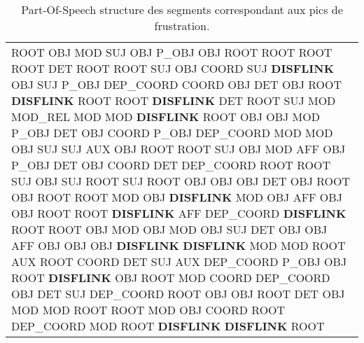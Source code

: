 \begin{table}[h]
    \centering
    \begin{tabular}{|l|}
         \hline
          ROOT OBJ MOD SUJ OBJ P_OBJ OBJ ROOT ROOT ROOT
          ROOT DET ROOT ROOT SUJ OBJ COORD SUJ \textbf{DISFLINK} OBJ SUJ P_OBJ DEP_COORD COORD OBJ DET OBJ
          ROOT \textbf{DISFLINK}
          ROOT ROOT \textbf{DISFLINK} DET ROOT SUJ MOD MOD_REL MOD MOD
          \textbf{DISFLINK}
          ROOT OBJ OBJ MOD P_OBJ DET OBJ COORD P_OBJ DEP_COORD MOD MOD OBJ SUJ SUJ AUX OBJ
          ROOT ROOT SUJ OBJ MOD AFF OBJ P_OBJ DET OBJ COORD DET DEP_COORD
          ROOT ROOT SUJ OBJ SUJ ROOT SUJ ROOT OBJ OBJ OBJ DET OBJ ROOT OBJ ROOT
          ROOT MOD OBJ \textbf{DISFLINK} MOD OBJ AFF OBJ OBJ
          ROOT ROOT \textbf{DISFLINK} AFF DEP_COORD \textbf{DISFLINK}
          ROOT ROOT OBJ MOD OBJ MOD OBJ SUJ
          DET OBJ OBJ AFF OBJ OBJ OBJ \textbf{DISFLINK} \textbf{DISFLINK} MOD MOD ROOT
          AUX ROOT COORD DET SUJ AUX DEP_COORD P_OBJ OBJ
          ROOT \textbf{DISFLINK} OBJ ROOT MOD COORD DEP_COORD OBJ DET SUJ DEP_COORD
          ROOT OBJ OBJ ROOT DET OBJ MOD MOD ROOT
          ROOT MOD OBJ COORD ROOT DEP_COORD MOD
          ROOT \textbf{DISFLINK} \textbf{DISFLINK} ROOT
         \hline
    \end{tabular}
    \caption{Part-Of-Speech structure des segments correspondant aux pics de frustration.}
    \label{tab:posPic}
\end{table}
